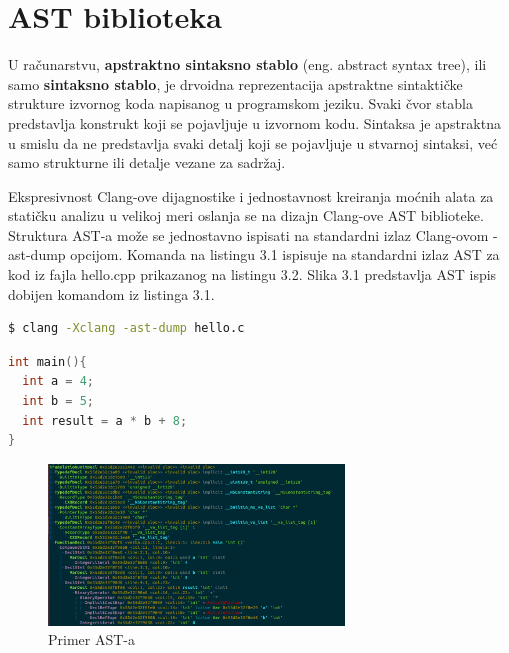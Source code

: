 \documentclass[12pt,oneside]{memoir}
\begin{document}
\section{AST biblioteka}

U računarstvu, \textbf{apstraktno sintaksno stablo} (eng. abstract syntax tree), ili samo \textbf{sintaksno stablo}, je drvoidna reprezentacija apstraktne sintaktičke strukture izvornog koda napisanog u programskom jeziku. Svaki čvor stabla predstavlja konstrukt koji se pojavljuje u izvornom kodu.
Sintaksa je apstraktna u smislu da ne predstavlja svaki detalj koji se pojavljuje u stvarnoj sintaksi, već samo strukturne ili detalje vezane za sadržaj.

Ekspresivnost Clang-ove dijagnostike i jednostavnost kreiranja mo\'{c}nih alata za stati\v{c}ku analizu u velikoj meri oslanja se na dizajn Clang-ove AST biblioteke. Struktura AST-a mo\v{z}e  se jednostavno ispisati na standardni izlaz Clang-ovom -ast-dump opcijom. Komanda na listingu 3.1 ispisuje na standardni izlaz AST za kod iz fajla hello.cpp prikazanog na listingu 3.2. Slika 3.1 predstavlja AST ispis dobijen komandom iz listinga 3.1.
\\

\begin{lstlisting}[caption={Komanda za ispisivanje Clang-ovog AST-a},label={lst:label},language=bash, captionpos=b]
$ clang -Xclang -ast-dump hello.c
\end{lstlisting}

\begin{lstlisting}[caption={Kod \v{c}iji je AST prikazan na slici 4.1},label={lst:label},language=C++, captionpos=b]
int main(){
  int a = 4;
  int b = 5;
  int result = a * b + 8;
}
\end{lstlisting}

\begin{figure}[!ht]
  \centering
  \includegraphics[width=0.7\textwidth]{ASTImage.png}
  \caption{Primer AST-a}
  \label{fig:grafikon}
\end{figure}
\end{document}
